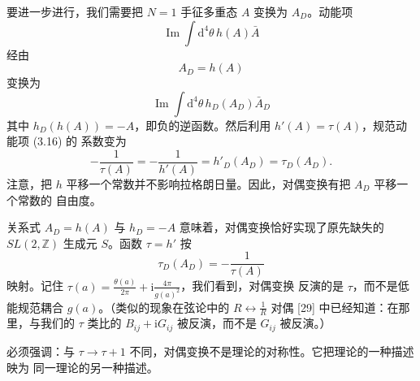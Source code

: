 \documentclass[11pt,a4paper,UTF8,fontset=fandol]{ctexart}
\theoremstyle{plain}
\theoremstyle{definition}
\newcommand{\Z}{\mathbb{Z}}
\newcommand{\dd}{\mathrm{d}}
\newcommand{\ii}{\mathrm{i}}
\renewcommand{\Im}{\operatorname{Im}}
\newcommand{\Nc}{\mathcal{N}}
\def\Nc{N}%
\begin{document}
要进一步进行，我们需要把 $\Nc=1$ 手征多重态 $A$ 变换为 $A_D$。动能项
\begin{equation}
  \Im\int \dd^4\theta\,h(A)\bar A \tag{3.17}
\end{equation}
经由
\begin{equation}
  A_D=h(A) \tag{3.18}
\end{equation}
变换为
\begin{equation}
  \Im\int \dd^4\theta\,h_D(A_D)\bar A_D \tag{3.19}
\end{equation}
其中 $h_D(h(A))=-A$，即负的逆函数。然后利用 $h'(A)=\tau(A)$，规范动能项 (3.16) 的
系数变为
\begin{equation}
  -\frac{1}{\tau(A)}=-\frac{1}{h'(A)}=h'_D(A_D)=\tau_D(A_D). \tag{3.20}
\end{equation}
注意，把 $h$ 平移一个常数并不影响拉格朗日量。因此，对偶变换有把 $A_D$ 平移一个常数的
自由度。

关系式 $A_D=h(A)$ 与 $h_D=-A$ 意味着，对偶变换恰好实现了原先缺失的 $SL(2,\Z)$ 生成元
$S$。函数 $\tau=h'$ 按
\begin{equation}
  \tau_D(A_D)=-\frac{1}{\tau(A)} \tag{3.21}
\end{equation}
映射。记住 $\tau(a)=\frac{\theta(a)}{2\pi}+\ii\frac{4\pi}{g(a)^2}$，我们看到，对偶变换
反演的是 $\tau$，而不是低能规范耦合 $g(a)$。（类似的现象在弦论中的
$R\leftrightarrow \frac{1}{R}$ 对偶 [29] 中已经知道：在那里，与我们的 $\tau$ 类比的
$B_{ij}+\ii G_{ij}$ 被反演，而不是 $G_{ij}$ 被反演。）

必须强调：与 $\tau\to\tau+1$ 不同，对偶变换不是理论的对称性。它把理论的一种描述映为
同一理论的另一种描述。
\end{document}
